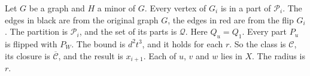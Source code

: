 Let $G$ be a graph and $H$ a minor of $G$. Every vertex of $G_i$ is in a part of $\mathcal{P}_i$.
The edges in black are from the original graph $G$, the edges in red are
from the flip $G_i$. The partition is $\mathcal{P}_i$, and the set of its
parts is $\mathcal{Q}$. Here $Q_u = Q_1$. Every part $P_u$ is flipped with
$P_W$. The bound is $d^2 t^3$, and it holds for each $r$. So the class is
$\mathcal{C}$, its closure is $\overline{\mathcal{C}}$, and the result is
$x_{i+1}$. Each of $u$, $v$ and $w$ lies in $X$. The radius is $r$.
